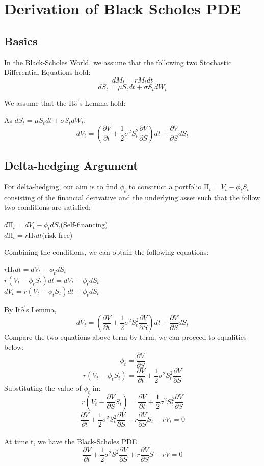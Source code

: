 \section{Derivation of Black Scholes PDE}

\subsection{Basics}
\begin{center}
In the Black-Scholes World, we assume that the following two Stochastic Differential Equations hold:
$$dM_{t}  = rM_{t}dt$$
$$dS_{t}  = \mu S_{t}dt + \sigma S_{t} dW_{t}$$
\end{center}
We assume that the It$\hat{o}^{\prime}$s Lemma hold:
\begin{center}
As $dS_{t} = \mu S_{t}dt + \sigma S_{t}dW_{t}$,
$$dV_{t} = (\frac{\partial V}{\partial t}+\frac{1}{2}\sigma^{2}S_{t}^{2}\frac{\partial V}{\partial S})dt + \frac{\partial V}{\partial S}dS_{t}$$
\end{center}

\subsection{Delta-hedging Argument}
For delta-hedging, our aim is to find $\phi_{t}$ to construct a portfolio $\mathrm{\Pi}_{t} = V_{t} - \phi_{t}S_{t}$ consisting of the financial derivative and the underlying asset such that the follow two conditions are satisfied:
\begin{center}
$d\mathrm{\Pi}_{t} = dV_{t} - \phi_{t}dS_{t}$(Self-financing)\\[1mm]
$d\mathrm{\Pi}_{t} = r\mathrm{\Pi}_{t}dt$(risk free)\\[2mm]
\end{center}
Combining the conditions, we can obtain the following equations:
\begin{center}
$r\mathrm{\Pi}_{t}dt = dV_{t} - \phi_{t}dS_{t}$\\[1mm]
$r(V_{t} - \phi_{t}S_{t})dt = dV_{t} - \phi_{t}dS_{t}$\\[3mm]
$dV_{t}  = r(V_{t} - \phi_{t}S_{t})dt + \phi_{t}dS_{t}$
\end{center}
By It$\hat{o}^{\prime}$s Lemma,
$$dV_{t} = (\frac{\partial V}{\partial t}+\frac{1}{2}\sigma^{2}S_{t}^{2}\frac{\partial V}{\partial S})dt + \frac{\partial V}{\partial S}dS_{t}$$
Compare the two equations above term by term, we can proceed to equalities below:
$$\phi_{t} = \frac{\partial V}{\partial S}$$
$$r(V_{t} - \phi_{t}S_{t}) = \frac{\partial V}{\partial t}+\frac{1}{2}\sigma^{2}S_{t}^{2}\frac{\partial V}{\partial S}$$
Substituting the value of $\phi_{t}$ in:
$$r(V_{t} - \frac{\partial V}{\partial S}S_{t}) = \frac{\partial V}{\partial t}+\frac{1}{2}\sigma^{2}S_{t}^{2}\frac{\partial V}{\partial S}$$
$$\frac{\partial V}{\partial t}+\frac{1}{2}\sigma^{2}S_{t}^{2}\frac{\partial V}{\partial S} + r\frac{\partial V}{\partial S}S_{t} - rV_{t} = 0$$\\
At time t, we have the Black-Scholes PDE
$$\frac{\partial V}{\partial t}+\frac{1}{2}\sigma^{2}S^{2}\frac{\partial V}{\partial S} + r\frac{\partial V}{\partial S}S - rV = 0$$
\newpage

